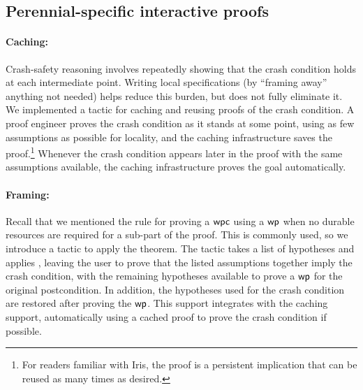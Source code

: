 \subsection{Perennial-specific interactive proofs}

\paragraph{Caching:} Crash-safety reasoning involves repeatedly showing
that the crash condition holds at each intermediate point.
Writing local specifications (by ``framing away'' anything not needed)
helps reduce this burden, but does not fully eliminate it.
We implemented a tactic for caching and reusing proofs of the crash condition.
A proof
engineer proves the crash condition as it stands at some point, using
as few assumptions as possible for locality, and the caching infrastructure saves
the proof.\footnote{For readers familiar with Iris, the proof is a persistent
implication that can be reused as many times as desired.}
Whenever the
crash condition appears later in the proof with the same assumptions available,
the caching infrastructure proves the goal automatically.

\paragraph{Framing:} Recall that we mentioned the  rule for
proving a $\textsf{\upshape wpc}$ using a $\textsf{\upshape wp}$ when no durable resources are required for a
sub-part of the proof. This is commonly used, so we introduce a 
tactic to apply the theorem. The tactic takes a list of hypotheses and applies
, leaving the user to prove that the listed assumptions
together imply the crash condition, with the remaining hypotheses available to
prove a $\textsf{\upshape wp}$ for the original postcondition. In addition, the hypotheses used
for the crash condition are restored after proving the $\textsf{\upshape wp}$. This support
integrates with the caching support, automatically using a cached proof to prove
the crash condition if possible.

